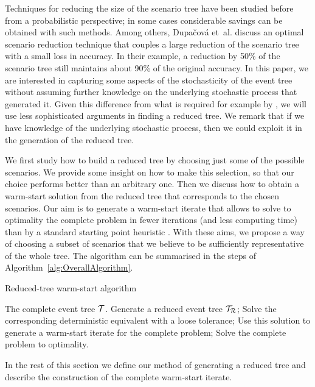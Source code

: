 Techniques for reducing the size of the scenario tree have been studied 
before from a probabilistic perspective; in some cases considerable 
savings can be obtained with such methods. Among others, 
Dupa\v{c}ov{\'a} et~al. \cite{Dupacova} discuss an optimal scenario 
reduction technique that couples a large reduction of the scenario 
tree with a small loss in accuracy. In their example, a reduction by 
50\% of the scenario tree still maintains about 90\% of the original 
accuracy.
In this paper, we are interested in capturing some aspects of the 
stochasticity of the event tree without assuming further knowledge on 
the underlying stochastic process that generated it. Given this difference 
from what is required for example by \cite{Dupacova}, we will use less 
sophisticated arguments in finding a reduced tree.
We remark that if we have knowledge of the underlying stochastic process,
then we could exploit it in the generation of the reduced tree.

We first study how to build a reduced tree by choosing just 
some of the possible scenarios. We provide some insight on how to make 
this selection, so that our choice performs better than an arbitrary 
one.
Then we discuss how to obtain a warm-start solution from the reduced 
tree that corresponds to the chosen scenarios.
Our aim is to generate a warm-start iterate that allows to solve to 
optimality the complete problem in fewer iterations (and less computing 
time) than by a standard starting point heuristic \cite{Mehrotra92}.
With these aims, we propose a way of choosing a subset of scenarios 
that we believe to be sufficiently representative of the whole tree.
The algorithm can be summarised in the steps of
Algorithm~\ref{alg:OverallAlgorithm}.
%
\begin{algorithm}[h]
  \caption{Reduced-tree warm-start algorithm}
  \begin{algorithmic}[0]  \label{alg:OverallAlgorithm}
    \REQUIRE The complete event tree $\mathcal{T}$.
    \smallskip
    \STATE Generate a reduced event tree $\mathcal{T}_\mathcal{R}$;
    \smallskip
    \STATE Solve the corresponding deterministic equivalent with a loose 
           tolerance;
    \smallskip
    \STATE Use this solution to generate a warm-start iterate for the 
    complete problem;
    \smallskip
    \STATE Solve the complete problem to optimality.
  \end{algorithmic}
\end{algorithm}

In the rest of this section we define our method of generating a 
reduced tree and describe the construction of the complete warm-start 
iterate.

